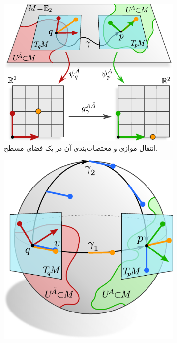 \begin{figure}
    \centering
    \begin{subfigure}[b]{0.5\textwidth}
        \centering
        \includegraphics[width=.95\textwidth]{figures/transport_flat.pdf}
        \vspace*{1ex}
        \caption{\small
            انتقال موازی و مختصات‌بندی آن در یک فضای مسطح.
        }
        \label{fig:transport_flat}
    \end{subfigure}
    \hfill
    \begin{subfigure}[b]{0.4\textwidth}
        \centering
        \includegraphics[width=\textwidth]{figures/transport_sphere.pdf}

\end{subfigure}
\end{figure}

